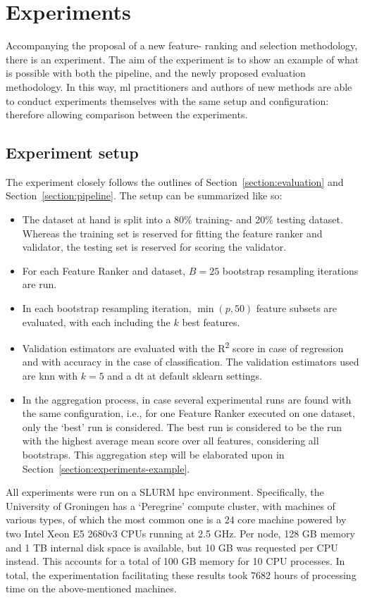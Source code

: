 \documentclass[../main.tex]{subfiles}
\begin{document}
\section{Experiments}\label{section:experiments}
Accompanying the proposal of a new feature- ranking and selection methodology, there is an experiment. The aim of the experiment is to show an example of what is possible with both the pipeline, and the newly proposed evaluation methodology. In this way, \gls{ml} practitioners and authors of new methods are able to conduct experiments themselves with the same setup and configuration: therefore allowing comparison between the experiments.



\subsection{Experiment setup}
The experiment closely follows the outlines of Section~\ref{section:evaluation} and Section~\ref{section:pipeline}. The setup can be summarized like so:

\begin{itemize}
    \item The dataset at hand is split into a 80\% training- and 20\% testing dataset. Whereas the training set is reserved for fitting the feature ranker and validator, the testing set is reserved for scoring the validator.
    \item For each Feature Ranker and dataset, $B = 25$ bootstrap resampling iterations are run.
    \item In each bootstrap resampling iteration, $\min (p, 50)$ feature subsets are evaluated, with each including the $k$ best features.
    \item Validation estimators are evaluated with the R\textsuperscript{2} score in case of regression and with accuracy in the case of classification. The validation estimators used are \gls{knn} with $k=5$ and a \gls{dt} at default sklearn settings.
    \item In the aggregation process, in case several experimental runs are found with the same configuration, i.e., for one Feature Ranker executed on one dataset, only the `best' run is considered. The best run is considered to be the run with the highest average mean score over all features, considering all bootstraps. This aggregation step will be elaborated upon in Section~\ref{section:experiments-example}.
\end{itemize}

All experiments were run on a SLURM \gls{hpc} environment. Specifically, the University of Groningen has a `Peregrine' compute cluster, with machines of various types, of which the most common one is a 24 core machine powered by two Intel Xeon E5 2680v3 CPUs running at 2.5 GHz. Per node, 128 GB memory and 1 TB internal disk space is available, but 10 GB was requested per CPU instead. This accounts for a total of 100 GB memory for 10 CPU processes. In total, the experimentation facilitating these results took 7682 hours of processing time on the above-mentioned machines.
\end{document}
